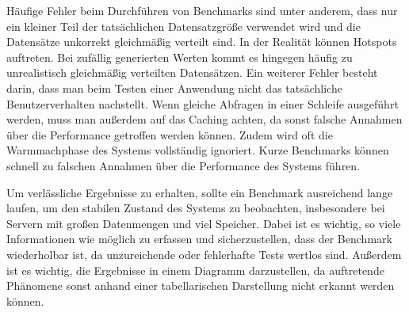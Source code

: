 Häufige Fehler beim Durchführen von Benchmarks sind unter anderem, dass nur ein kleiner Teil
der tatsächlichen Datensatzgröße verwendet wird und die Datensätze unkorrekt gleichmäßig
verteilt sind. In der Realität können Hotspots auftreten. Bei zufällig generierten Werten
kommt es hingegen häufig zu unrealistisch gleichmäßig verteilten Datensätzen. Ein weiterer
Fehler besteht darin, dass man beim Testen einer Anwendung nicht das tatsächliche
Benutzerverhalten nachstellt. Wenn gleiche Abfragen in einer Schleife ausgeführt werden,
muss man außerdem auf das Caching achten, da sonst falsche Annahmen über die Performance
getroffen werden können. Zudem wird oft die Warmmachphase des Systems vollständig ignoriert.
Kurze Benchmarks können schnell zu falschen Annahmen über die Performance des Systems führen.

Um verlässliche Ergebnisse zu erhalten, sollte ein Benchmark ausreichend lange laufen,
um den stabilen Zustand des Systems zu beobachten, insbesondere bei Servern mit großen
Datenmengen und viel Speicher. Dabei ist es wichtig, so viele Informationen wie möglich zu
erfassen und sicherzustellen, dass der Benchmark wiederholbar ist, da unzureichende oder
fehlerhafte Tests wertlos sind. Außerdem ist es wichtig, die Ergebnisse in einem Diagramm
darzustellen, da auftretende Phänomene sonst anhand einer tabellarischen Darstellung nicht
erkannt werden können.

